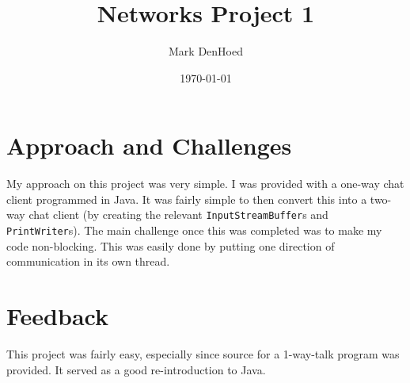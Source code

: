 \documentclass[letterpaper, 12pt]{article}
\author{Mark DenHoed}
\title{Networks Project 1}
\date{\today}
\begin{document}
\maketitle

\section*{Approach and Challenges}
My approach on this project was very simple. I was provided with a one-way chat client programmed in Java. It was fairly simple to then convert this into a two-way chat client (by creating the relevant \verb+InputStreamBuffer+s and \verb+PrintWriter+s). The main challenge once this was completed was to make my code non-blocking. This was easily done by putting one direction of communication in its own thread.
\section*{Feedback}
This project was fairly easy, especially since source for a 1-way-talk program was provided. It served as a good re-introduction to Java.
\end{document}
